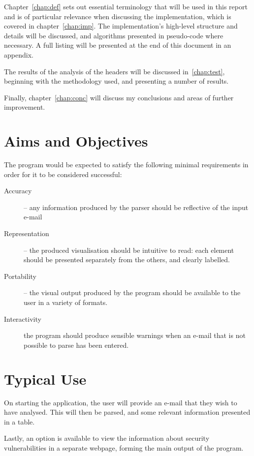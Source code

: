 \documentclass[twoside,10pt]{scrreprt}
\begin{document}
Chapter~\ref{chap:def} sets out essential terminology that will be used in this report and is of particular relevance when discussing the implementation, which is covered in chapter~\ref{chap:imp}.  The implementation's high-level structure and details will be discussed, and algorithms presented in pseudo-code where necessary.  A full listing will be presented at the end of this document in an appendix.

The results of the analysis of the headers will be discussed in~\ref{chap:test}, beginning with the methodology used, and presenting a number of results.

Finally, chapter~\ref{chap:conc} will discuss my conclusions and areas of further improvement.

\section{Aims and Objectives}

The program would be expected to satisfy the following minimal requirements in order for it to be considered successful: 
\begin{description}
\item [{Accuracy}]  -- any information produced by the parser should be reflective of the input e-mail
\item [{Representation}] -- the produced visualisation should be intuitive to read: each element should be presented separately from the others, and clearly labelled. 
\item [{Portability}] -- the visual output produced by the program should be available to the user in a variety of formats. 
\item [{Interactivity}] the program should produce sensible warnings when
an e-mail that is not possible to parse has been entered. 
\end{description}

\section{Typical Use}

On starting the application, the user will provide an e-mail that they wish to have analysed.  This will then be parsed, and some relevant information presented in a table. 

Lastly, an option is available to view the information about security vulnerabilities in a separate webpage, forming the main output of the program.
\end{document}

